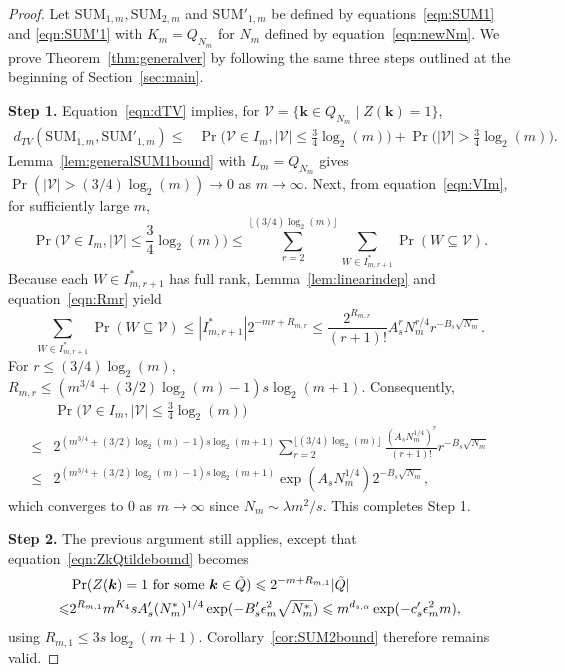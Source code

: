 \documentclass{article}
\theoremstyle{definition}
\renewcommand{\le}{\leqslant}
\renewcommand{\leq}{\leqslant}
\newcommand{\bsk}{\boldsymbol{k}}
\begin{document}
\begin{proof}
  Let $\mathrm{SUM}_{1,m}, \mathrm{SUM}_{2,m}$ and $\mathrm{SUM}'_{1,m}$ be defined by equations~\eqref{eqn:SUM1} and \eqref{eqn:SUM'1} with  $K_m=Q_{N_m}$ for $N_m$ defined by equation~\eqref{eqn:newNm}. We prove Theorem~\ref{thm:generalver} by following the same three steps outlined at the beginning of Section~\ref{sec:main}.

\textbf{Step 1.} Equation~\eqref{eqn:dTV} implies,  for $\mathcal{V}=\{\bsk\in Q_{N_m}\mid Z(\bsk)=1\}$,
 \begin{align*}
 d_{TV}(\mathrm{SUM}_{1,m},\mathrm{SUM}'_{1,m})
 \leq & \Pr\Big(\mathcal{V}\in I_m, |\mathcal{V}|\le\frac{3}{4}\log_2(m)\Big)+\Pr\Big(|\mathcal{V}|>\frac{3}{4}\log_2(m)\Big).
 \end{align*}
 Lemma~\ref{lem:generalSUM1bound} with $L_m=Q_{N_m}$ gives $\Pr(|\mathcal{V}|>(3/4)\log_2(m))\to 0$ as $m\to\infty$. Next, from equation~\eqref{eqn:VIm}, for sufficiently large $m$,
 \begin{equation*}
    \Pr\Big(\mathcal{V}\in I_m, |\mathcal{V}|\leq \frac{3}{4}\log_2(m) \Big)  \leq \sum_{r=2}^{\lfloor(3/4)\log_2(m)\rfloor} \sum_{W\in I^*_{m,r+1}}\Pr(W\subseteq \mathcal{V}).
    \end{equation*}
    Because each $W\in I^*_{m,r+1}$ has full rank, Lemma~\ref{lem:linearindep} and equation~\eqref{eqn:Rmr} yield
$$\sum_{W\in I^*_{m,r+1}}\Pr(W\subseteq \mathcal{V})\leq |I^*_{m,r+1}|2^{-mr+R_{m,r}}\leq \frac{2^{R_{m,r}}}{(r+1)!}A^r_s N_m^{r/4} r^{-B_s\sqrt{N_m}}.$$
For $r\leq (3/4)\log_2(m)$, $R_{m,r}\leq (m^{3/4}+(3/2)\log_2(m)-1)s\log_2(m+1)$. Consequently, 
\begin{align*}
  & \Pr\Big(\mathcal{V}\in I_m, |\mathcal{V}|\leq \frac{3}{4}\log_2(m) \Big) \\
  \leq &2^{(m^{3/4}+(3/2)\log_2(m)-1)s\log_2(m+1)} \sum_{r=2}^{\lfloor(3/4)\log_2(m)\rfloor}  \frac{(A_s N^{1/4}_m)^r}{(r+1)!} r^{-B_s\sqrt{N_m}}\\
  \leq & 2^{(m^{3/4}+(3/2)\log_2(m)-1)s\log_2(m+1)}\exp(A_s N^{1/4}_m) 2^{-B_s\sqrt{N_m}},
\end{align*}
which converges to $0$ as $m\to\infty$ since $N_m\sim \lambda m^2/s$. This completes Step 1.

\textbf{Step 2.}  The previous argument still applies, except that equation~\eqref{eqn:ZkQtildebound} becomes
\begin{align*}
&\Pr(Z(\bsk)=1 \text{ for some }\bsk\in \Tilde{Q})\leq 2^{-m+R_{m,1}}|\Tilde{Q}|\\ \le &2^{R_{m,1}} m^{K_4} s A'_s(N^*_m)^{1/4}\exp(-B'_s \epsilon_m^2 \sqrt{N^*_m})
\leq  m^{d_{s,\alpha} }\exp(-c'_s \epsilon_m^2 m),    
\end{align*}
using $R_{m,1}\leq 3s\log_2(m+1)$. Corollary~\ref{cor:SUM2bound} therefore remains valid.


\end{proof}
\end{document}
